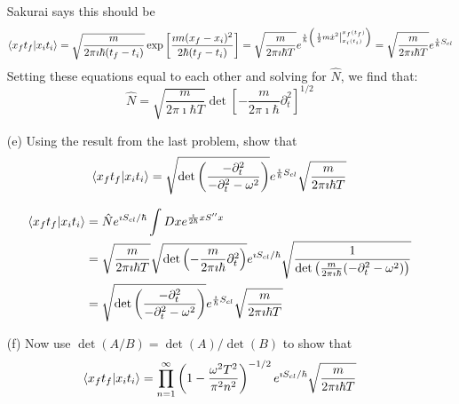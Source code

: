 \documentclass[a4paper,twoside]{article}
\begin{document}
\begin{itemize}
\begin{problem}
            Sakurai says this should be
            \begin{equation}
                \bra{x_f t_f}\ket{x_i t_i} = \sqrt{\frac{m}{2 \pi \imath \hbar (t_f - t_i)}} \exp\left[ \frac{\imath m(x_f - x_i)^2}{2 \hbar (t_f - t_i)} \right] = \sqrt{\frac{m}{2 \pi \imath \hbar T}} e^{\frac{\imath}{\hbar} \left( \eval{\frac{1}{2} m \dot{x}^2}_{x_i(t_i)}^{x_f(t_f)} \right)} = \sqrt{\frac{m}{2 \pi \imath \hbar T}} e^{\frac{\imath}{\hbar} S_{cl}}
            \end{equation}
            Setting these equations equal to each other and solving for $ \hat{N} $, we find that:
            \begin{equation}
                \hat{N} = \sqrt{\frac{m}{2 \pi \imath \hbar T}} \det\left[ - \frac{m}{2 \pi \imath \hbar} \partial_t^2 \right]^{1/2}
            \end{equation}
        \end{problem}
    \item[(e)] Using the result from the last problem, show that
        \begin{equation}
            \bra{x_f t_f}\ket{x_i t_i} = \sqrt{\det \left( \frac{- \partial_t^2}{- \partial_t^2 - \omega^2} \right)} e^{\frac{\imath}{\hbar} S_{cl}} \sqrt{\frac{m}{2 \pi \imath \hbar T}}
        \end{equation}
        \begin{problem}
            \begin{align}
                \bra{x_f t_f}\ket{x_i t_i} &= \hat{N} e^{\imath S_{cl} / \hbar} \int Dx e^{\frac{\imath}{2 \hbar} xS''x} \\
                &= \sqrt{\frac{m}{2 \pi \imath \hbar T}} \sqrt{\det\left( - \frac{m}{2 \pi \imath \hbar} \partial_t^2 \right)} e^{\imath S_{cl} / \hbar} \sqrt{\frac{1}{\det\left( \frac{m}{2 \pi \imath \hbar} (- \partial_t^2 - \omega^2) \right)}} \\
                &= \sqrt{\det \left( \frac{- \partial_t^2}{- \partial_t^2 - \omega^2} \right)} e^{\frac{\imath}{\hbar} S_{cl}} \sqrt{\frac{m}{2 \pi \imath \hbar T}}
            \end{align}
        \end{problem}
    \item[(f)] Now use $ \det(A/B) = \det(A)/\det(B) $ to show that
        \begin{equation}
            \bra{x_f t_f}\ket{x_i t_i} = \prod_{n=1}^{\infty} \left( 1 - \frac{\omega^2 T^2}{\pi^2 n^2} \right)^{-1/2} e^{\imath S_{cl} / \hbar} \sqrt{\frac{m}{2 \pi \imath \hbar T}}

\end{equation}
\end{itemize}
\end{document}
